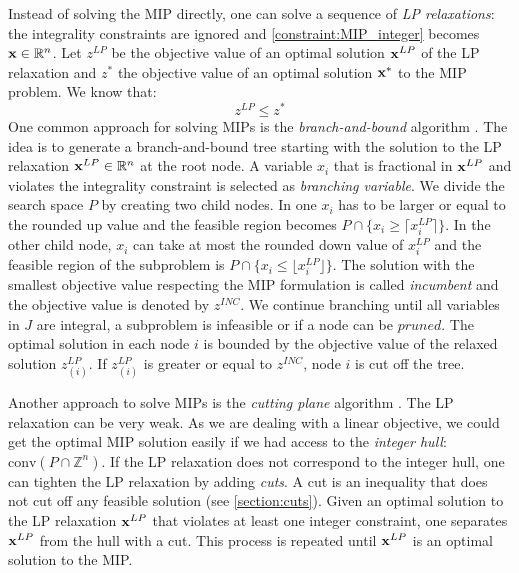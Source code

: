 Instead of solving the MIP directly, one can solve a sequence of \textit{LP relaxations}: the integrality constraints are ignored and \cref{constraint:MIP_integer} becomes $\bold x \in \mathbb{R}^n$.
Let $z^{LP}$ be the objective value of an optimal solution $\bold{x}^{LP}$ of the LP relaxation and $z^*$ the objective value of an optimal solution $\bold{x^*}$ to the MIP problem. We know that: 
\begin{equation*} \label{Eq:bound}
    z^{LP} \leq z^*
\end{equation*}
One common approach for solving MIPs is the \textit{branch-and-bound} algorithm \cite{integer_programming}. The idea is to generate a branch-and-bound tree starting with the solution to the LP relaxation $\bold x^{LP} \in \mathbb{R}^n$ at the root node. A variable $x_i$ that is fractional in $\bold x^{LP}$ and violates the integrality constraint is selected as \textit{branching variable}. We divide the search space $P$ by creating two child nodes. In one $x_i$ has to be larger or equal to the rounded up value and the feasible region becomes $P \cap \{x_i \geq \lceil x_i^{LP} \rceil \}$. In the other child node, $x_i$ can take at most the rounded down value of $x_i^{LP}$ and the feasible region of the subproblem is $P \cap \{x_i \leq \lfloor x_i^{LP} \rfloor \}$. The solution with the smallest objective value respecting the MIP formulation is called \textit{incumbent} and the objective value is denoted by $z^{INC}$. We continue branching until all variables in $J$ are integral, a subproblem is infeasible or if a node can be $pruned$. The optimal solution in each node $i$ is bounded by the objective value of the relaxed solution $z^{LP}_{(i)}$. If $z^{LP}_{(i)}$ is greater or equal to $z^{INC}$, node $i$ is cut off the tree. 


Another approach to solve MIPs is the \textit{cutting plane} algorithm \cite{integer_programming}. The LP relaxation can be very weak. As we are dealing with a linear objective, we could get the optimal MIP solution easily if we had access to the \textit{integer hull}: $\text{conv}(P \cap \mathbb{Z}^n)$. If the LP relaxation does not correspond to the integer hull, one can tighten the LP relaxation by adding \textit{cuts}. A cut is an inequality that does not cut off any feasible solution (see \cref{section:cuts}). Given an optimal solution to the LP relaxation $\bold x^{LP}$ that violates at least one integer constraint, one separates $\bold x^{LP}$ from the hull with a cut. This process is repeated until $\bold x^{LP}$ is an optimal solution to the MIP.

